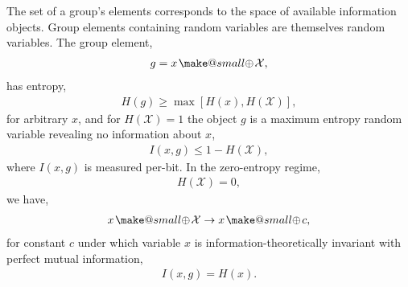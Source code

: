 \documentclass[twocolumn, aps, amsmath, amssymb, nofootinbib, superscriptaddress, longbibliography, doublefloatfix, table-of-contents, eqsecnum, rmp]{revtex4-2}
\makeatletter
\newcommand{\soplus}{{{\hspace{1pt}}{\mathbin{\mathpalette\make@small{\mathbin\oplus}}}}{\hspace{1pt}}}
\newcommand{\make@small}[2]{%
  \vcenter{\hbox{%
    \scalebox{0.6}{$\m@th#1#2$}%
  }}%
}
\makeatother
\begin{document}


The set of a group's elements corresponds to the space of available information objects. Group elements containing random variables are themselves random variables. The group element,
\begin{align}
	g = x\soplus \mathcal{X},
\end{align}
has entropy,
\begin{align}
	H(g) \geq \max[H(x), H(\mathcal{X})],
\end{align}
for arbitrary $x$, and for $H(\mathcal{X})=1$ the object $g$ is a maximum entropy random variable revealing no information about $x$,
\begin{align}
	I(x,g) \leq 1-H(\mathcal{X}),
\end{align}
where $I(x,g)$ is measured per-bit. In the zero-entropy regime,
\begin{align}
	H(\mathcal{X}) = 0,
\end{align}
we have,
\begin{align}
	x\soplus \mathcal{X} \to x\soplus c,
\end{align}	
for constant $c$ under which variable $x$ is information-theoretically invariant with perfect mutual information,
\begin{align}
	I(x,g) = H(x).
\end{align}

\end{document}
